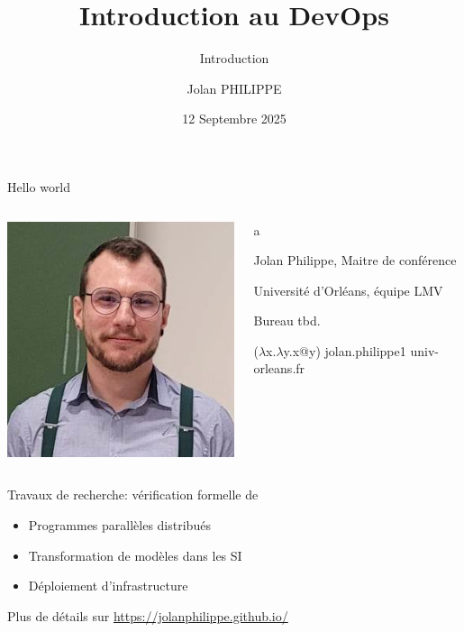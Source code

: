 \documentclass[aspectratio=169,10pt]{beamer}
\title{Introduction au DevOps}
\subtitle{Introduction}
\date{12 Septembre 2025}
\author{Jolan PHILIPPE}
\institute{Université d'Orléans}
\begin{document}
\begin{frame}
    \titlepage 
\end{frame}


\begin{frame}{Hello world}
    
\begin{columns}[T]
\begin{column}{.3\textwidth} 
\includegraphics[scale=1]{images/jolan.jpg}
\end{column}
\hspace{-1in}
\begin{column}{.7\textwidth}

{\color{white}a}


Jolan Philippe, Maitre de conférence

Université d'Orléans, équipe LMV

Bureau tbd.

($\lambda$x.$\lambda$y.x@y) jolan.philippe1 univ-orleans.fr

\vspace{1cm}

\end{column}
\end{columns}

Travaux de recherche: vérification formelle de
\vspace{-0.1cm}
\begin{itemize}
    \item Programmes parallèles distribués
    \item Transformation de modèles dans les SI
    \item Déploiement d'infrastructure
\end{itemize}
Plus de détails sur  
\url{https://jolanphilippe.github.io/}
 
\end{frame}
\end{document}
